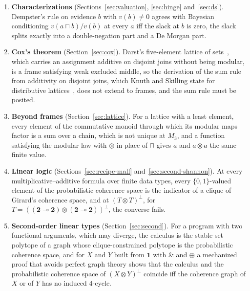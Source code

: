 \begin{enumerate}
\item \textbf{Characterizations} (Sections~\ref{sec:valuation},
  \ref{sec:hinge} and~\ref{sec:ds}).  Dempster's rule on evidence $b$
  with $v(b) \neq 0$ agrees with Bayesian conditioning
  $v(a \sqcap b)/v(b)$ at every $a$ iff the slack at $b$ is zero, the
  slack splits exactly into a double-negation part and a De Morgan
  part.

\item \textbf{Cox's theorem} (Section~\ref{sec:cox}).  Darst's
  five-element lattice of sets~\cite{darst1970}, which carries an
  assignment additive on disjoint joins without being modular, is a frame
  satisfying weak excluded middle, so the derivation of the sum rule from
  additivity on disjoint joins, which Knuth and Skilling state for
  distributive lattices~\cite{knuth-skilling2012}, does not extend to
  frames, and the sum rule must be posited.

\item \textbf{Beyond frames} (Section~\ref{sec:lattice}).  For a lattice
  with a least element, every element of the commutative monoid through
  which its modular maps factor is a sum over a chain, which is not
  unique at $M_3$, and a function satisfying the modular law with
  $\otimes$ in place of $\sqcap$ gives $a$ and $a \otimes a$ the same
  finite value.

\item \textbf{Linear logic} (Sections~\ref{sec:recipe-mall}
  and~\ref{sec:second-shannon}).  At every multiplicative--additive
  formula over finite data types, every $\{0,1\}$-valued element of the
  probabilistic coherence space is the indicator of a clique of Girard's
  coherence space, and at $(T \otimes T)^{\perp}$, for
  $T = ((\mathbf{2} \multimap \mathbf{2}) \otimes (\mathbf{2} \multimap
  \mathbf{2}))^{\perp}$, the converse fails.

\item \textbf{Second-order linear types} (Section~\ref{sec:second}).
  For a program with two functional arguments, which may diverge, the
  calculus is the stable-set polytope of a graph whose clique-constrained
  polytope is the probabilistic coherence space, and for $X$ and $Y$
  built from $\mathbf{1}$ with $\mathbin{\&}$ and $\oplus$ a mechanized
  proof that avoids perfect graph theory shows that the calculus and the
  probabilistic coherence space of $(X \otimes Y)^{\perp}$ coincide iff
  the coherence graph of $X$ or of $Y$ has no induced $4$-cycle.


\end{enumerate}

